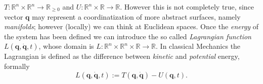 		$T:\mathbb{R}^{n}\times\mathbb{R}^{n}\rightarrow\mathbb{R}_{\geq0}$ and
		$U:\mathbb{R}^{n}\times\mathbb{R}\rightarrow\mathbb{R}$.
		However this is not completely true, since vector $\bm{q}$
		may represent a coordinatization of more abstract surfaces,
		namely \emph{manifolds}; however (locally) we can think at Euclidean spaces.
		Once the \emph{energy} of the system has been defined we can introduce 
		the so called \emph{Lagrangian function} $L(\bm{q},\dot{\bm{q}},t)$,
		whose domain is $L:\mathbb{R}^{n}\times\mathbb{R}^{n}\times\mathbb{R}\rightarrow\mathbb{R}$.
		In classical Mechanics the Lagrangian is defined as the difference 
		between \emph{kinetic} and \emph{potential} energy, formally
		\begin{equation}
			\label{eq:lagrangianfunction}
			L(\bm{q},\dot{\bm{q}},t) := T(\bm{q},\dot{\bm{q}}) - U(\bm{q},t).
		\end{equation}
